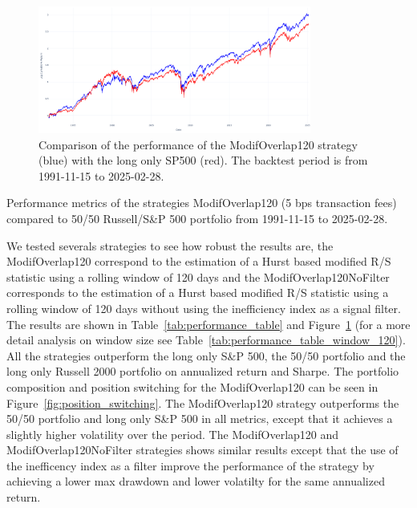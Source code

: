 \documentclass[11pt]{extarticle}
\begin{document}
\begin{figure}[ht]
    \centering
    \includegraphics[width=0.8\textwidth]{img/log_cumulative_returns_strat_sp500.png}
    \caption{Comparison of the performance of the ModifOverlap120 strategy (blue) with the long only SP500 (red).
        The backtest period is from 1991-11-15 to 2025-02-28.}
    \label{fig:cumulative_performance}
\end{figure}

\FloatBarrier

\begin{table}[!h]
    \centering
    \caption{Performance metrics of the strategies ModifOverlap120 (5 bps transaction fees) compared to 50/50 Russell/S\&P 500 portfolio
    from 1991-11-15 to 2025-02-28.}
    \label{tab:performance_table}
\end{table}

\FloatBarrier

\label{sec:backtest_results}
We tested severals strategies to see how robust the results are, the ModifOverlap120 correspond to the estimation of a
Hurst based modified R/S statistic using a rolling window of 120 days and the ModifOverlap120NoFilter corresponds to the estimation of a
Hurst based modified R/S statistic using a rolling window of 120 days without using the inefficiency index as a signal filter.
The results are shown in Table~\ref{tab:performance_table} and Figure~\ref{fig:cumulative_performance} (for a more detail analysis
on window size see Table~\ref{tab:performance_table_window_120}).
All the strategies outperform the long only S\&P 500, the 50/50 portfolio and the long only Russell 2000 portfolio on annualized return and Sharpe.
The portfolio composition and position switching for the ModifOverlap120 can be seen in Figure~\ref{fig:position_switching}.
The ModifOverlap120 strategy outperforms the 50/50 portfolio and long only S\&P 500 in all metrics, except
that it achieves a slightly higher volatility over the period. The ModifOverlap120 and ModifOverlap120NoFilter strategies
shows similar results except that the use of the inefficency index as a filter improve the performance of the strategy by
achieving a lower max drawdown and lower volatilty for the same annualized return.
\end{document}
